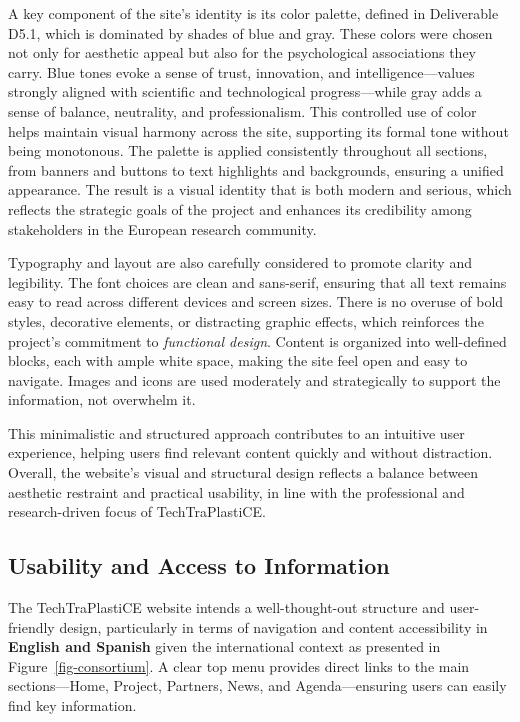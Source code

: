 \documentclass[
  12pt,
  oneside]{book}
\begin{document}
A key component of the site's identity is its color palette, defined in
Deliverable D5.1, which is dominated by shades of blue and gray. These
colors were chosen not only for aesthetic appeal but also for the
psychological associations they carry. Blue tones evoke a sense of
trust, innovation, and intelligence---values strongly aligned with
scientific and technological progress---while gray adds a sense of
balance, neutrality, and professionalism. This controlled use of color
helps maintain visual harmony across the site, supporting its formal
tone without being monotonous. The palette is applied consistently
throughout all sections, from banners and buttons to text highlights and
backgrounds, ensuring a unified appearance. The result is a visual
identity that is both modern and serious, which reflects the strategic
goals of the project and enhances its credibility among stakeholders in
the European research community.

Typography and layout are also carefully considered to promote clarity
and legibility. The font choices are clean and sans-serif, ensuring that
all text remains easy to read across different devices and screen sizes.
There is no overuse of bold styles, decorative elements, or distracting
graphic effects, which reinforces the project's commitment to
\emph{functional design}. Content is organized into well-defined blocks,
each with ample white space, making the site feel open and easy to
navigate. Images and icons are used moderately and strategically to
support the information, not overwhelm it.

This minimalistic and structured approach contributes to an intuitive
user experience, helping users find relevant content quickly and without
distraction. Overall, the website's visual and structural design
reflects a balance between aesthetic restraint and practical usability,
in line with the professional and research-driven focus of
TechTraPlastiCE.

\subsection{Usability and Access to
Information}\label{usability-and-access-to-information}

The TechTraPlastiCE website intends a well-thought-out structure and
user-friendly design, particularly in terms of navigation and content
accessibility in \textbf{English and Spanish} given the international
context as presented in Figure~\ref{fig-consortium}. A clear top menu
provides direct links to the main sections---Home, Project, Partners,
News, and Agenda---ensuring users can easily find key information.
\end{document}
